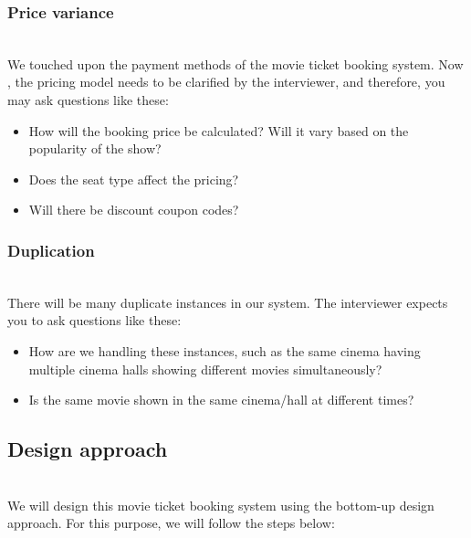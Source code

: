 \subsubsection{Price variance}\label{ssGtkKIrSGy3NX5f_EtnS}
\\
We touched upon the payment methods of the movie ticket booking system. Now , the pricing model needs to be clarified by the interviewer, and therefore, you may ask questions like these:

\begin{itemize}
\item
\protect{}\label{Xv3Yng3O8bRBDkf4TVWaA}
How will the booking price be calculated? Will it vary based on the popularity of the show?
\item
\protect{}\label{S5_h4kViGjJvxk0LI8Jhu}
Does the seat type affect the pricing?
\item
\protect{}\label{nISofqLNYBxOhuvX9UcF7}
Will there be discount coupon codes?
\end{itemize}

\subsubsection{Duplication}\label{pJeX34_fRjJLE3liabeKv}
\\
There will be many duplicate instances in our system. The interviewer expects you to ask questions like these:

\begin{itemize}
\item
\protect{}\label{SgB6yqOqF8RYh1vMy7qdw}
How are we handling these instances, such as the same cinema having multiple cinema halls showing different movies simultaneously?
\item
\protect{}\label{yJJlAix0vbm2YFLyf0qkd}
Is the same movie shown in the same cinema/hall at different times?
\end{itemize}

\subsection{Design approach}\label{qYgIVqznecKd2pUDQYQ0b}
\\
We will design this movie ticket booking system using the bottom-up design approach. For this purpose, we will follow the steps below:

